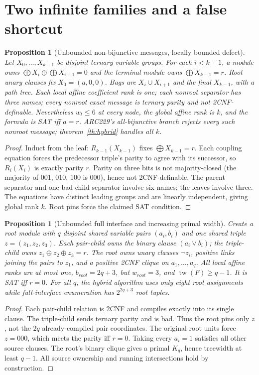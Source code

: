 \documentclass[10pt]{article}
\newtheorem{proposition}[theorem]{Proposition}
\newcommand{\tw}{\operatorname{tw}}
\begin{document}
\section{Two infinite families and a false shortcut}
\begin{proposition}[Unbounded non-bijunctive messages, locally bounded defect]
Let $X_0,\ldots,X_{k-1}$ be disjoint ternary variable groups. For each $i<k-1$, a module owns $\bigoplus X_i\oplus\bigoplus X_{i+1}=0$ and the terminal module owns $\bigoplus X_{k-1}=r$. Root unary clauses fix $X_0=(a,0,0)$. Bags are $X_i\cup X_{i+1}$ and the final $X_{k-1}$, with a path tree. Each local affine coefficient rank is one; each nonroot separator has three names; every nonroot exact message is ternary parity and \emph{not} 2CNF-definable. Nevertheless $w_t\le6$ at every node, the global affine rank is $k$, and the formula is SAT iff $a=r$. ARC229's all-bijunctive branch rejects every such nonroot message; theorem~\ref{th:hybrid} handles all $k$.
\end{proposition}
\begin{proof}
Induct from the leaf: $R_{k-1}(X_{k-1})$ fixes $\bigoplus X_{k-1}=r$. Each coupling equation forces the predecessor triple's parity to agree with its successor, so $R_i(X_i)$ is exactly parity $r$. Parity on three bits is not majority-closed (the majority of 001, 010, 100 is 000), hence not 2CNF-definable. The parent separator and one bad child separator involve six names; the leaves involve three. The equations have distinct leading groups and are linearly independent, giving global rank $k$. Root pins force the claimed SAT condition.
\end{proof}
\begin{proposition}[Unbounded full interface and increasing primal width]
Create a root module with $q$ disjoint shared variable pairs $(a_i,b_i)$ and one shared triple $z=(z_1,z_2,z_3)$. Each pair-child owns the binary clause $(a_i\lor b_i)$; the triple-child owns $z_1\oplus z_2\oplus z_3=r$. The root owns unary clauses $\neg z_i$, positive links joining the pairs to $z_1$, and a positive 2CNF clique on $a_1,\ldots,a_q$. All local affine ranks are at most one, $b_{root}=2q+3$, but $w_{root}=3$, and $\tw(F)\ge q-1$. It is SAT iff $r=0$. For all $q$, the hybrid algorithm uses only eight root assignments while full-interface enumeration has $2^{2q+3}$ root tuples.
\end{proposition}
\begin{proof}
Each pair-child relation is 2CNF and compiles exactly into its single clause. The triple-child sends ternary parity and is bad. Thus the root pins only $z$, not the $2q$ already-compiled pair coordinates. The original root units force $z=000$, which meets the parity iff $r=0$. Taking every $a_i=1$ satisfies all other source clauses. The root's binary clique gives a primal $K_q$, hence treewidth at least $q-1$. All source ownership and running intersections hold by construction.
\end{proof}
\end{document}
